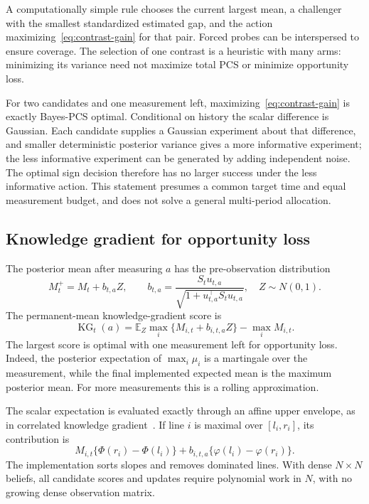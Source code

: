 \documentclass[11pt]{article}
\newcommand{\E}{\mathbb E}
\begin{document}
A computationally simple rule chooses the current largest mean, a challenger with the smallest standardized estimated gap, and the action maximizing~\eqref{eq:contrast-gain} for that pair. Forced probes can be interspersed to ensure coverage. The selection of one contrast is a heuristic with many arms: minimizing its variance need not maximize total PCS or minimize opportunity loss.

For two candidates and one measurement left, maximizing~\eqref{eq:contrast-gain} is exactly Bayes-PCS optimal. Conditional on history the scalar difference is Gaussian. Each candidate supplies a Gaussian experiment about that difference, and smaller deterministic posterior variance gives a more informative experiment; the less informative experiment can be generated by adding independent noise. The optimal sign decision therefore has no larger success under the less informative action. This statement presumes a common target time and equal measurement budget, and does not solve a general multi-period allocation.

\subsection{Knowledge gradient for opportunity loss}
The posterior mean after measuring $a$ has the pre-observation distribution
\begin{equation}
M_t^+=M_t+b_{t,a}Z,\qquad
b_{t,a}=\frac{S_tu_{t,a}}{\sqrt{1+u_{t,a}^\top S_tu_{t,a}}},
\quad Z\sim N(0,1).
\end{equation}
The permanent-mean knowledge-gradient score is
\begin{equation}
\boxed{\operatorname{KG}_t(a)=
\E_Z\max_i\{M_{i,t}+b_{i,t,a}Z\}-\max_iM_{i,t}.}
\label{eq:kg}
\end{equation}
The largest score is optimal with one measurement left for opportunity loss. Indeed, the posterior expectation of $\max_i\mu_i$ is a martingale over the measurement, while the final implemented expected mean is the maximum posterior mean. For more measurements this is a rolling approximation.

The scalar expectation is evaluated exactly through an affine upper envelope, as in correlated knowledge gradient~\cite{frazier2009}. If line $i$ is maximal over $[l_i,r_i]$, its contribution is
\[
M_{i,t}\{\Phi(r_i)-\Phi(l_i)\}
+b_{i,t,a}\{\varphi(l_i)-\varphi(r_i)\}.
\]
The implementation sorts slopes and removes dominated lines. With dense $N\times N$ beliefs, all candidate scores and updates require polynomial work in $N$, with no growing dense observation matrix.
\end{document}

